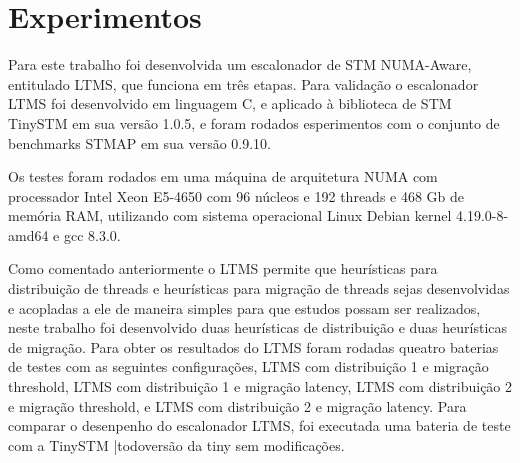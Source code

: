 \documentclass[diss,capa]{texufpel}
\begin{document}







\chapter{Experimentos}
\label{chapter::experimentos}

Para este trabalho foi desenvolvida um escalonador de STM NUMA-Aware, entitulado LTMS, que funciona em três etapas. Para validação o escalonador LTMS foi desenvolvido em linguagem C, e aplicado à biblioteca de STM TinySTM em sua versão 1.0.5, e foram rodados esperimentos com o conjunto de benchmarks STMAP em sua versão 0.9.10.

Os testes foram rodados em uma máquina de arquitetura NUMA com processador Intel Xeon E5-4650 com 96 núcleos e 192 threads e 468 Gb de memória RAM, utilizando com sistema operacional Linux Debian kernel 4.19.0-8-amd64  e gcc 8.3.0.

Como comentado anteriormente o LTMS permite que heurísticas para distribuição de threads e heurísticas para migração de threads sejas desenvolvidas e acopladas a ele de maneira simples para que estudos possam ser realizados, neste trabalho foi desenvolvido duas heurísticas de distribuição e duas heurísticas de migração. Para obter os resultados do LTMS foram rodadas queatro baterias de testes com as seguintes configurações, LTMS com distribuição 1 e migração threshold, LTMS com distribuição 1 e migração latency, LTMS com distribuição 2 e migração threshold, e LTMS com distribuição 2 e migração latency. Para comparar o desenpenho do escalonador LTMS, foi executada uma bateria de teste com a TinySTM |todo{versão da tiny} sem modificações.
\end{document}
